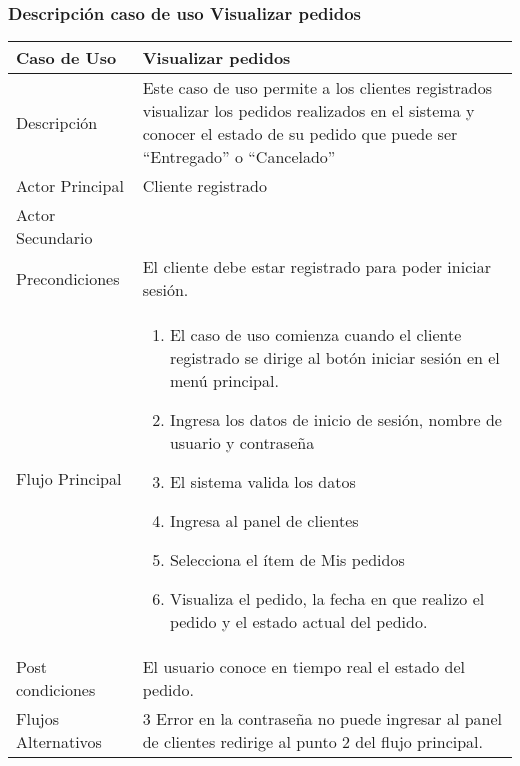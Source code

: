 \documentclass[12pt,a4paper]{article}
\begin{document}
\subsubsection*{Descripción caso de uso Visualizar pedidos}
\begin{table}[h]
        \centering
        \begin{tabular}{| p{3cm}| p{11cm} |} 
        \hline  
        Caso de Uso         &    \textbf{ Visualizar pedidos}   \\ 
        \hline
        Descripción         &    Este caso de uso permite a los clientes registrados visualizar los pedidos realizados en el sistema y conocer el estado de su pedido que puede ser “Entregado” o “Cancelado”   \\ 
        \hline
        Actor Principal     &   Cliente registrado   \\ 
        \hline
        Actor Secundario    &       \\ 
        \hline
        Precondiciones      &   El cliente debe estar registrado para poder iniciar sesión.  	\\
        \hline
        Flujo Principal     &    

            \begin{enumerate}
                \item El caso de uso comienza cuando el cliente registrado se dirige al botón iniciar sesión en el menú principal.
                \item Ingresa los datos de inicio de sesión, nombre de usuario y contraseña
                \item El sistema valida los datos
                \item Ingresa al panel de clientes
                \item Selecciona el ítem de Mis pedidos
                \item Visualiza el pedido, la fecha en que realizo el pedido y el estado actual del pedido.
            \end{enumerate}
        \\  
        \hline
        Post condiciones    &    El usuario conoce en tiempo real el estado del pedido.   \\  
        \hline
        Flujos Alternativos &   3 Error en la contraseña no puede ingresar al panel de clientes redirige al punto 2 del flujo principal.    \\  
        \hline
        \end{tabular}
    \end{table}
\end{document}
